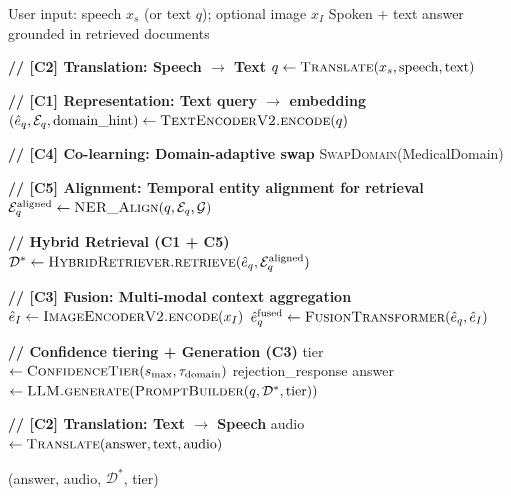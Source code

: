 \documentclass[12pt,a4paper]{article}
\theoremstyle{definition}
\theoremstyle{plain}
\theoremstyle{remark}
\newcommand{\Sph}{\mathbb{S}}
\newcommand{\KG}{\mathcal{G}}
\begin{document}
\begin{algorithm}[H]
\caption{Unified MIVA-KNIGHT-MML: All Five Challenges (End-to-End)}
\label{alg:unified}
\begin{algorithmic}[1]
\Require User input: speech $x_s$ (or text $q$); optional image $x_I$
\Ensure Spoken + text answer grounded in retrieved documents

\State \textbf{// [C2] Translation: Speech $\to$ Text}
  \State $q \gets \textsc{Translate}(x_s, \text{speech}, \text{text})$ 
\EndIf

\State \textbf{// [C1] Representation: Text query $\to$ embedding}
\State $(\hat{e}_q, \mathcal{E}_q, \text{domain\_hint}) \gets \textsc{TextEncoderV2.encode}(q)$
  \Comment{BERT + TextProj $\to \Sph^{511}$}

\State \textbf{// [C4] Co-learning: Domain-adaptive swap}
  \State \textsc{SwapDomain}(MedicalDomain) 
\EndIf

\State \textbf{// [C5] Alignment: Temporal entity alignment for retrieval}
\State $\mathcal{E}_q^{\text{aligned}} \gets \textsc{NER\_Align}(q, \mathcal{E}_q, \KG)$ 

\State \textbf{// Hybrid Retrieval (C1 + C5)}
\State $\mathcal{D}^* \gets \textsc{HybridRetriever.retrieve}(\hat{e}_q, \mathcal{E}_q^{\text{aligned}})$

\State \textbf{// [C3] Fusion: Multi-modal context aggregation}
  \State $\hat{e}_I \gets \textsc{ImageEncoderV2.encode}(x_I)$ 
  \State $\hat{e}_q^{\text{fused}} \gets \textsc{FusionTransformer}(\hat{e}_q, \hat{e}_I)$ 
\EndIf

\State \textbf{// Confidence tiering + Generation (C3)}
\State tier $\gets \textsc{ConfidenceTier}(s_{\max}, \tau_{\text{domain}})$
 \Return rejection\_response \EndIf
\State answer $\gets \textsc{LLM.generate}(\textsc{PromptBuilder}(q, \mathcal{D}^*, \text{tier}))$

\State \textbf{// [C2] Translation: Text $\to$ Speech}
\State audio $\gets \textsc{Translate}(\text{answer}, \text{text}, \text{audio})$ 

\State \Return (answer, audio, $\mathcal{D}^*$, tier)
\end{algorithmic}
\end{algorithm}
\end{document}
